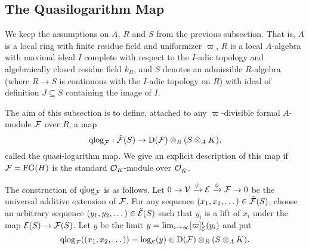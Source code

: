 \documentclass[../main.tex]{subfiles}
\begin{document}

\subsection{The Quasilogarithm Map} %
\label{sub:The Quasilogarithm map}
We keep the assumptions on $A$, $R$ and $S$ from the previous subsection. That is,
$A$ is a local ring with finite residue field and uniformizer $\varpi$, 
$R$ is a local $A$-algebra with maximal ideal $I$ complete with respect to
the $I$-adic topology and algebraically closed residue field $k_R$, and 
$S$ denotes an admissible $R$-algebra (where $R \to S$ is continuous with
the $I$-adic topology on $R$) with ideal of definition $J \subseteq S$ containing
the image of $I$. 

The aim of this subsection is to define, attached to any $\varpi$-divisible formal
$A$-module $\mathcal{F}$ over $R$, a map
\begin{equation*}
\mathrm{qlog}_{\mathcal{F}}: \tilde {\mathcal{F}}(S) \to \mathrm{D}(\mathcal{F}) \otimes_R (S \otimes_A K),
\end{equation*}
called the quasi-logarithm map.
We give an explicit description of this map if $\mathcal{F} = \textnormal{FG}(H)$ is the standard
$\mathcal{O}_K$-module over $\mathcal{O}_{\breve K}$. 

The construction of $\mathrm{qlog}_{\mathcal{F}}$ is as follows.  
Let $0 \to \mathcal{V} \xrightarrow{\psi} \mathcal{E} \xrightarrow{\phi} \mathcal{F} \to 0$ be the universal additive
extension of $\mathcal{F}$. For any sequence $(x_1, x_2, \dots) \in \tilde {\mathcal{F}}(S)$, choose an arbitrary sequence $(y_1, y_2, \dots) \in
\tilde {\mathcal{E}}(S)$ such that $y_i$ is a lift of $x_i$ under the map $\mathcal{E}(S) \to \mathcal{F}(S)$. 
Let $y$ be the limit $y = \lim_{i \to \infty} [\varpi]_{\mathcal{E}}^i(y_i)$ and put 
$$\mathrm{qlog}_{\mathcal{F}}((x_1, x_2, \dots)) = \log_{\mathcal{E}}(y) \in \mathrm{D}(\mathcal{F}) \otimes_R(S \otimes_A K).$$ 
\end{document}
